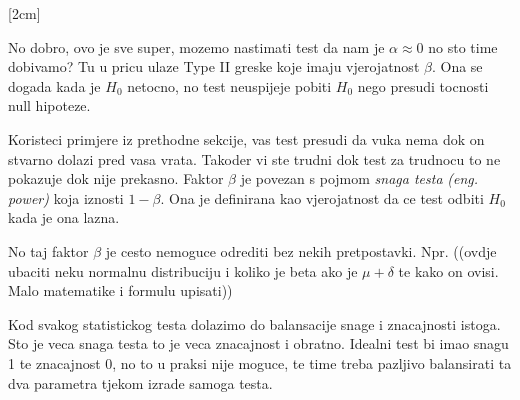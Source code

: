 [2cm]

No dobro, ovo je sve super, mozemo nastimati test da nam je $\alpha \approx 0$ no sto time dobivamo? Tu u pricu ulaze Type II greske koje imaju vjerojatnost $\beta$. Ona se dogada kada je $H_0$ netocno, no test neuspijeje pobiti $H_0$ nego presudi tocnosti null hipoteze.

Koristeci primjere iz prethodne sekcije, vas test presudi da vuka nema dok on stvarno dolazi pred vasa vrata. Takoder vi ste trudni dok test za trudnocu to ne pokazuje dok nije prekasno. Faktor $\beta$ je povezan s pojmom \emph{snaga testa} \textit{(eng. power)} koja iznosti $1-\beta$. Ona je definirana kao vjerojatnost da ce test odbiti $H_0$ kada je ona lazna. 

No taj faktor $\beta$ je cesto nemoguce odrediti bez nekih pretpostavki. Npr. ((ovdje ubaciti neku normalnu distribuciju i koliko je beta ako je $\mu  + \delta$ te kako on ovisi. Malo matematike i formulu upisati))

Kod svakog statistickog testa dolazimo do balansacije snage i znacajnosti istoga. Sto je veca snaga testa to je veca znacajnost i obratno. Idealni test bi imao snagu 1 te znacajnost 0, no to u praksi nije moguce, te time treba pazljivo balansirati ta dva parametra tjekom izrade samoga testa.

